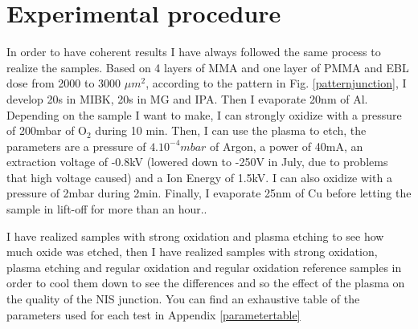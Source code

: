         \section{Experimental procedure}
        
            In order to have coherent results I have always followed the same process to realize the samples. Based on 4 layers of MMA and one layer of PMMA and EBL dose from 2000 to 3000 $\mu m^2$, according to the pattern in Fig. \ref{patternjunction}, I develop 20s in MIBK, 20s in MG and IPA. Then I evaporate 20nm of Al. Depending on the sample I want to make, I can strongly oxidize with a pressure of 200mbar of O$_2$ during 10 min. Then, I can use the plasma to etch, the parameters are a pressure of $4.10^{-4}mbar$ of Argon, a power of 40mA, an extraction voltage of -0.8kV (lowered down to -250V in July, due to problems that high voltage caused) and a Ion Energy of 1.5kV. I can also oxidize with a pressure of 2mbar during 2min. Finally, I evaporate 25nm of Cu before letting the sample in lift-off for more than an hour..
            
            I have realized samples with strong oxidation and plasma etching to see how much oxide was etched, then I have realized samples with strong oxidation, plasma etching and regular oxidation and regular oxidation reference samples in order to cool them down to see the differences and so the effect of the plasma on the quality of the NIS junction.  You can find an exhaustive table of the parameters used for each test in Appendix \ref{parametertable}
            
